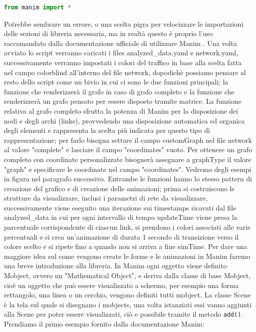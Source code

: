\documentclass[binding=0.6cm]{sapthesis}
\begin{document}
{\scriptsize
\begin{lstlisting}[language=Python]
    from manim import *
\end{lstlisting}
}

Potrebbe sembrare un errore, o una scelta pigra per velocizzare le importazioni delle sezioni di libreria necessaria, ma in realtà questo è proprio
l'uso raccomandato dalla documentazione ufficiale di utilizzare Manim \cite{ManimDocs}.
Una volta avviato lo script verranno caricati i files analyzed\_data.yaml e network.yaml, successivamente verranno impostati i colori del traffico in base
alla scelta fatta nel campo colorblind all'interno del file network, dopodichè possiamo pensare al resto dello script come un bivio in cui ci sono le due funzioni principali;
la funzione che renderizzerà il grafo in caso di grafo completo e la funzione che renderizzerà un grafo pensato per essere disposto
tramite matrice. La funzione relativa al grafo completo sfrutta la potenza di Manim per la disposizione dei nodi e degli archi (links), provvedendo
una disposizione automatica ed organica degli elementi e rappresenta la scelta più indicata per questo tipo di rappresentazione; per
farlo bisogna settare il campo customGraph nel file network al valore "complete" e lasciare il campo "coordinates" vuoto. Per ottenere un grafo
completo con coordinate personalizzate bisognerà assegnare a graphType il valore "graph" e specificare le coordinate nel campo "coordinates". 
Vedremo degli esempi in figura nel paragrafo successivo. Entrambe le funzioni hanno lo stesso pattern di creazione del grafico e di creazione delle animazioni;
prima si costruiscono le strutture da visualizzare, inclusi i parametri di rete da visualizzare, successivamente viene eseguito una iterazione sui timestamps ricavati
dal file analyzed\_data in cui per ogni intervallo di tempo updateTime viene presa la parcentuale corrispondente di ciascun link, 
si prendono i colori associati alle varie percentuali e si crea un'animazione di durata 1 secondo di transizione verso il colore scelto e si ripete 
fino a quando non si arriva a fine simTime.
Per dare una maggiore idea sul come vengono create le forme e le animazioni in Manim faremo una breve introduzione alla libreria.
In Manim ogni oggetto viene definito Mobject, ovvero un "Mathematical Object", e deriva dalla classe di base Mobject, cioè un oggetto che può essere visualizzato a schermo,
per esempio una forma rettangolo, una linea o un cerchio, vengono definiti tutti mobject.
La classe Scene è la tela sul quale si disegnano i mobjects, una volta istanziati essi vanno aggiunti alla Scene per poter essere visualizzati,
ciò e possibile tramite il metodo \lstinline|add()|. Prendiamo il primo esempio fornito dalla documentazione Manim:
\end{document}
